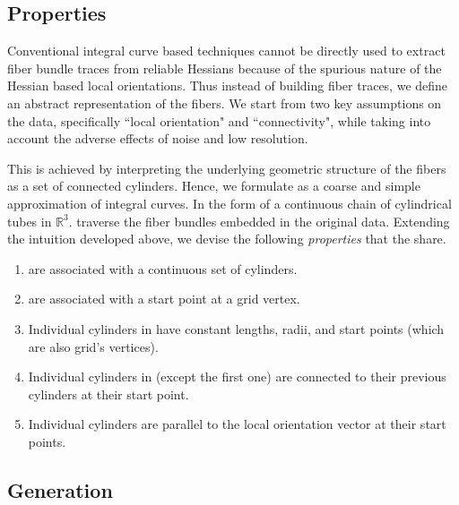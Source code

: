 \subsection{\mt Properties}\label{subsec:mt_properties}
Conventional integral curve based techniques cannot be directly used to extract fiber bundle traces from reliable Hessians because of the spurious nature of the Hessian based local orientations.
Thus instead of building fiber traces, we define an abstract representation of the fibers.
We start from two key assumptions on the data, specifically ``local orientation" and ``connectivity", while taking into account the adverse effects of noise and low resolution.

This is achieved by interpreting the underlying geometric structure of the fibers as a set of connected cylinders. 
Hence, we formulate \mt as a coarse and simple approximation of integral curves. In the form of a continuous chain of cylindrical tubes in $\mathbb{R}^3$. \mt traverse the fiber bundles embedded in the original data. Extending the intuition developed above, 
we devise the following \textit{properties} that the \mt share.
\begin{enumerate}
	\item{\mt are associated with a continuous set of cylinders.}
	\item{\mt are associated with a start point at a grid vertex.}
	\item{Individual cylinders in \mt have constant lengths, radii, and start points (which are also grid's vertices).}
	\item{Individual cylinders in \mt (except the first one) are connected to their previous cylinders at their start point.}
	\item{Individual cylinders are parallel to the local orientation vector at their start points.}
\end{enumerate} 

\subsection{\mt Generation}\label{subsec:mt_generation}

